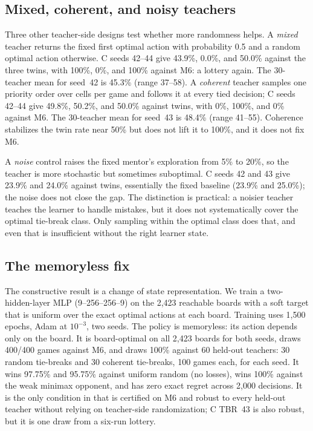 \documentclass[conference]{IEEEtran}
\begin{document}
\subsection{Mixed, coherent, and noisy teachers}
Three other teacher-side designs test whether more randomness helps. A \emph{mixed} teacher returns the fixed first optimal action with probability 0.5 and a random optimal action otherwise. C seeds 42--44 give 43.9\%, 0.0\%, and 50.0\% against the three twins, with 100\%, 0\%, and 100\% against M6: a lottery again. The 30-teacher mean for seed~42 is 45.3\% (range 37--58). A \emph{coherent} teacher samples one priority order over cells per game and follows it at every tied decision; C seeds 42--44 give 49.8\%, 50.2\%, and 50.0\% against twins, with 0\%, 100\%, and 0\% against M6. The 30-teacher mean for seed~43 is 48.4\% (range 41--55). Coherence stabilizes the twin rate near 50\% but does not lift it to 100\%, and it does not fix M6.

A \emph{noise} control raises the fixed mentor's exploration from 5\% to 20\%, so the teacher is more stochastic but sometimes suboptimal. C seeds 42 and 43 give 23.9\% and 24.0\% against twins, essentially the fixed baseline (23.9\% and 25.0\%); the noise does not close the gap. The distinction is practical: a noisier teacher teaches the learner to handle mistakes, but it does not systematically cover the optimal tie-break class. Only sampling within the optimal class does that, and even that is insufficient without the right learner state.

\subsection{The memoryless fix}
The constructive result is a change of state representation. We train a two-hidden-layer MLP (9--256--256--9) on the 2{,}423 reachable boards with a soft target that is uniform over the exact optimal actions at each board. Training uses 1{,}500 epochs, Adam at $10^{-3}$, two seeds. The policy is memoryless: its action depends only on the board. It is board-optimal on all 2{,}423 boards for both seeds, draws 400/400 games against M6, and draws 100\% against 60 held-out teachers: 30 random tie-breaks and 30 coherent tie-breaks, 100 games each, for each seed. It wins 97.75\% and 95.75\% against uniform random (no losses), wins 100\% against the weak minimax opponent, and has zero exact regret across 2{,}000 decisions. It is the only condition in  that is certified on M6 and robust to every held-out teacher without relying on teacher-side randomization; C TBR~43 is also robust, but it is one draw from a six-run lottery.
\end{document}
